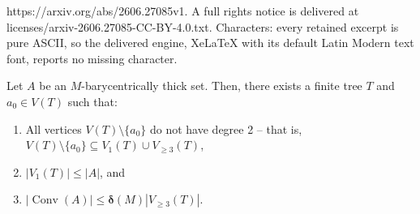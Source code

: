 \documentclass[10pt,a4paper]{amsart}
\DeclareMathOperator{\conv}{Conv}
\newcommand{\bdelta}{{\boldsymbol\delta}}
\begin{document}
https://arxiv.org/abs/2606.27085v1. A full rights notice is delivered at licenses/arxiv-2606.27085-CC-BY-4.0.txt. Characters: every retained excerpt is pure ASCII, so the delivered engine, XeLaTeX with its default Latin Modern text font, reports no missing character.
    \begin{lemma}\label{approximating tree}
        Let $A$ be an $M$-barycentrically thick set. Then, there exists a finite tree $T$ and $a_0\in V(T)$ such that:
    \begin{enumerate}[label=(T\arabic*)]
        \item \label{T has no deg 2} All vertices $V(T)\setminus \{a_0\}$ do not have degree 2 -- that is, $V(T) \setminus \{a_0\} \subseteq  V_1(T)\cup V_{\ge 3}(T)$,
        \item \label{leaves of T}  $|V_1(T)|\le |A|$, and
        \item \label{T covers C}  $|\conv(A)| \le \bdelta(M)|V_{\ge 3}(T)|$.
    \end{enumerate}
    \end{lemma}
\end{document}
